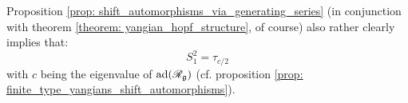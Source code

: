             \begin{remark}
                Proposition \ref{prop: shift_automorphisms_via_generating_series} (in conjunction with theorem \ref{theorem: yangian_hopf_structure}, of course) also rather clearly implies that:
                    $$S_1^2 = \tau_{c/2}$$
                with $c$ being the eigenvalue of $\mathrm{ad}(\mathscr{R}_{\mathfrak{g}})$ (cf. proposition \ref{prop: finite_type_yangians_shift_automorphisms}).
            \end{remark}
    
    \printbibliography

